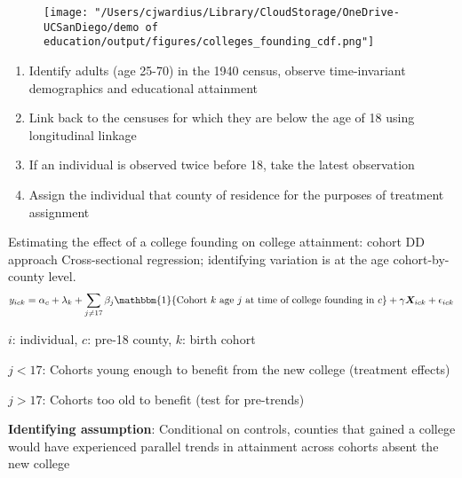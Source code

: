 \documentclass[notes,11pt, aspectratio=169]{beamer}
\newenvironment{wideitemize}{\itemize\addtolength{\itemsep}{10pt}}{\enditemize}
\begin{document}
\begin{frame}{\color{orange}{New college founding dates}}
  \begin{figure}
        \centering
        \texttt{[image: "/Users/cjwardius/Library/CloudStorage/OneDrive-UCSanDiego/demo of education/output/figures/colleges\_founding\_cdf.png"]}
    \end{figure}
\end{frame}

\begin{frame}{\color{ForestGreen}{Determining whether an individual lived near a college founding}}
  \begin{enumerate}
    \item Identify adults (age 25-70) in the 1940 census, observe time-invariant demographics and educational attainment
    \item Link back to the censuses for which they are below the age of 18 using \cite{rugglesIPUMSUSAVersion2025} longitudinal linkage
    \item If an individual is observed twice before 18, take the latest observation
    \item Assign the individual that county of residence for the purposes of treatment assignment 
  \end{enumerate}
\end{frame}

\begin{frame}{\color{ForestGreen}{Comparing linked versus unlinked individuals in the census}}
  
\end{frame}


\begin{frame}{Estimating the effect of a college founding on college attainment: cohort DD approach}
  Cross-sectional regression; identifying variation is at the age cohort-by-county level.
  \begin{equation}
    y_{ick} = \alpha_c + \lambda_k + \sum_{j \neq 17} \beta_j \mathbbm{1}\{\text{Cohort } k \text{ age } j \text{ at time of college founding in } c\} + \gamma \bm{X}_{ick} + \epsilon_{ick}
  \end{equation}
  \begin{wideitemize}
    \item $i$: individual, $c$: pre-18 county, $k$: birth cohort
    \item $j < 17$: Cohorts young enough to benefit from the new college (treatment effects)
    \item $j > 17$: Cohorts too old to benefit (test for pre-trends)
    \item \textbf{Identifying assumption}: Conditional on controls, counties that gained a college would have experienced parallel trends in attainment across cohorts absent the new college
  \end{wideitemize}
\end{frame}
\end{document}
